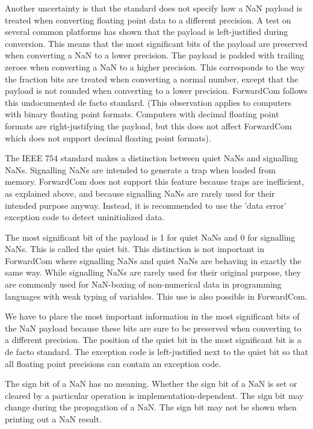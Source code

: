 \documentclass[forwardcom.tex]{subfiles}
\begin{document}
Another uncertainty is that the standard does not specify how a NaN payload is treated when converting floating point data to a different precision. A test on several common platforms has shown that the payload is left-justified during conversion. This means that the most significant bits of the payload are preserved  when converting a NaN to a lower precision. The payload is padded with trailing zeroes when converting a NaN to a higher precision. This corresponds to the way the fraction bits are treated when converting a normal number, except that the payload is not rounded when converting to a lower precision. ForwardCom follows this undocumented de facto standard. (This observation applies to computers with binary floating point formats. Computers with decimal floating point formats are right-justifying the payload, but this does not affect ForwardCom which does not support decimal floating point formats).
\vv

The IEEE 754 standard makes a distinction between quiet NaNs and signalling NaNs. Signalling NaNs are intended to generate a trap when loaded from memory. ForwardCom does not support this feature because traps are inefficient, as explained above, and because signalling NaNs are rarely used for their intended purpose anyway. Instead, it is recommended to use the 'data error' exception code to detect uninitialized data.
\vv

The most significant bit of the payload is 1 for quiet NaNs and 0 for signalling NaNs. This is called the quiet bit. This distinction is not important in ForwardCom where signalling NaNs and quiet NaNs are behaving in exactly the same way. While signalling NaNs are rarely used for their original purpose, they are commonly used for NaN-boxing of non-numerical data in programming languages with weak typing of variables. This use is also possible in ForwardCom.
\vv

We have to place the most important information in the most significant bits of the NaN payload because these bits are sure to be preserved when converting to a different precision. The position of the quiet bit in the most significant bit is a de facto standard. The exception code is left-justified next to the quiet bit so that all floating point precisions can contain an exception code.
\vv

The sign bit of a NaN has no meaning. Whether the sign bit of a NaN is set or cleared by a particular operation is implementation-dependent. The sign bit may change during the propagation of a NaN. The sign bit may not be shown when printing out a NaN result.
\vv
\end{document}
